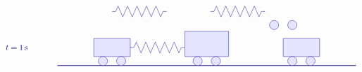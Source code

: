 \begin{solution}
\begin{itemize}
\begin{equation*}
\begin{tikzpicture}[scale=0.8, color=blue!50!black]
\begin{scope}[yshift=0cm]
\begin{scope}[xshift=9.4cm]
            \draw[fill=blue!10] (2.5,0.25) circle (0.25);
            \draw[fill=blue!10] (3.5,0.25) circle (0.25);
          \end{scope}
          \begin{scope}[xshift=3cm]
            \draw (0,1) -- ++(0.2,0) -- ++(0.13,0.3)
            -- ++(0.26,-0.6) -- ++(0.26,0.6)
            -- ++(0.26,-0.6) -- ++(0.26,0.6)
            -- ++(0.26,-0.6) -- ++(0.26,0.6)
            -- ++(0.26,-0.6) -- ++(0.26,0.6)
            -- ++(0.26,-0.6) -- ++(0.13,0.3)
            -- ++(0.2,0);
          \end{scope}
          \begin{scope}[xshift=8.4cm]
            \draw (0,1) -- ++(0.2,0) -- ++(0.13,0.3)
            -- ++(0.26,-0.6) -- ++(0.26,0.6)
            -- ++(0.26,-0.6) -- ++(0.26,0.6)
            -- ++(0.26,-0.6) -- ++(0.26,0.6)
            -- ++(0.26,-0.6) -- ++(0.26,0.6)
            -- ++(0.26,-0.6) -- ++(0.13,0.3)
            -- ++(0.2,0);
          \end{scope}
        \end{scope}
        \begin{scope}[yshift=-2cm]
          \draw (-3,1) node[right] {$t=1\s$};
          \draw[thick] (0,0) -- (16.4,0);
          \begin{scope}[xshift=0cm]
            \draw[fill=blue!10] (2,0.5) rectangle (4,1.5);
            \draw[fill=blue!10] (2.5,0.25) circle (0.25);
            \draw[fill=blue!10] (3.5,0.25) circle (0.25);
          \end{scope}
          \begin{scope}[xshift=5.2cm]
            \draw[fill=blue!10] (1.8,0.5) rectangle (4.2,1.9);
            \draw[fill=blue!10] (2.5,0.25) circle (0.25);
            \draw[fill=blue!10] (3.5,0.25) circle (0.25);
          \end{scope}
          \begin{scope}[xshift=10.4cm]
            \draw[fill=blue!10] (2,0.5) rectangle (4,1.5);
            \draw[fill=blue!10] (2.5,0.25) circle (0.25);
            \draw[fill=blue!10] (3.5,0.25) circle (0.25);
          \end{scope}
          \begin{scope}[xshift=4cm]
            \draw (0,1) -- ++(0.2,0) -- ++(0.13,0.3)
            -- ++(0.26,-0.6) -- ++(0.26,0.6)
            -- ++(0.26,-0.6) -- ++(0.26,0.6)
            -- ++(0.26,-0.6) -- ++(0.26,0.6)
            -- ++(0.26,-0.6) -- ++(0.26,0.6)
            -- ++(0.26,-0.6) -- ++(0.13,0.3)
            -- ++(0.2,0);

\end{scope}
\end{scope}
\end{tikzpicture}
\end{equation*}
\end{itemize}
\end{solution}
